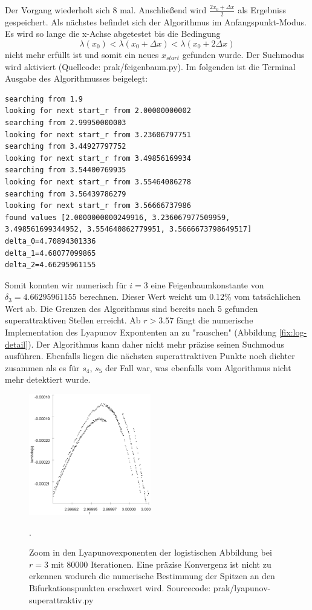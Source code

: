 \documentclass[12pt,a4paper]{article}
\begin{document}
Der Vorgang wiederholt sich 8 mal. Anschließend wird $\frac{2x_0 + \Delta x}{2}$ als Ergebniss gespeichert. 
Als nächstes befindet sich der Algorithmus im Anfangspunkt-Modus. Es wird so lange die x-Achse abgetestet bis die Bedingung 
\begin{equation}
\lambda(x_0) < \lambda(x_0 + \Delta x) < \lambda(x_0 + 2\Delta x)
\end{equation}
nicht mehr erfüllt ist und somit ein neues $x_{start}$ gefunden wurde. Der Suchmodus wird aktiviert  (Quellcode: prak/feigenbaum.py).
Im folgenden ist die Terminal Ausgabe des Algorithmusses beigelegt:
\begin{lstlisting}
searching from 1.9
looking for next start_r from 2.00000000002
searching from 2.99950000003
looking for next start_r from 3.23606797751
searching from 3.44927797752
looking for next start_r from 3.49856169934
searching from 3.54400769935
looking for next start_r from 3.55464086278
searching from 3.56439786279
looking for next start_r from 3.56666737986
found values [2.0000000000249916, 3.236067977509959, 3.498561699344952, 3.554640862779951, 3.5666673798649517]
delta_0=4.70894301336
delta_1=4.68077099865
delta_2=4.66295961155
\end{lstlisting}
Somit konnten wir numerisch für $i=3$ eine Feigenbaumkonstante von $\delta_3=4.66295961155$ berechnen. Dieser Wert weicht um 0.12\% vom tatsächlichen Wert ab. Die Grenzen des Algorithmus sind bereits nach 5 gefunden superattraktiven Stellen erreicht. Ab $r>3.57$ fängt die numerische Implementation des Lyapunov Expontenten an zu "rauschen" (Abbildung \ref{fix:log-detail}). Der Algorithmus kann daher nicht mehr präzise seinen Suchmodus ausführen. Ebenfalls liegen die nächsten superattraktiven Punkte noch dichter zusammen als es für $s_4$, $s_5$ der Fall war, was ebenfalls vom Algorithmus nicht mehr detektiert wurde. 
\begin{figure}
\centering
\includegraphics[height=200px]{lya-rauschen}
\caption{Zoom in den Lyapunovexponenten der logistischen Abbildung bei $r=3$ mit 80000 Iterationen. 
Eine präzise Konvergenz ist nicht zu erkennen wodurch die numerische Bestimmung der Spitzen an den Bifurkationspunkten erschwert wird. Sourcecode: prak/lyapunov-superattraktiv.py}. 
\label{fig:lya-rauschen}
\end{figure}
\end{document}
